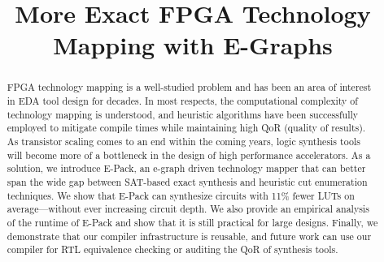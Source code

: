 \documentclass[sigplan,nonacm]{acmart}
\newcommand{\fullname}{More Exact FPGA Technology Mapping with E-Graphs}
\newcommand{\metric}{11\% fewer LUTs}
\begin{document}
\title{\fullname}

\begin{abstract}
    FPGA technology mapping is a well-studied problem and has been an area of
    interest in EDA tool design for decades. In most respects, the computational
    complexity of technology mapping is understood, and heuristic algorithms have
    been successfully employed to mitigate compile times while maintaining high QoR
    (quality of results). As transistor scaling comes to an end within the coming
    years, logic synthesis tools will become more of a bottleneck in the design of
    high performance accelerators. As a solution, we introduce E-Pack, an e-graph
    driven technology mapper that can better span the wide gap between SAT-based
    exact synthesis and heuristic cut enumeration techniques. We show that E-Pack
    can synthesize circuits with \metric{} on average---without ever
    increasing circuit depth. We also provide an empirical analysis of the runtime
    of E-Pack and show that it is still practical for large designs. Finally, we
    demonstrate that our compiler infrastructure is reusable, and future work can
    use our compiler for RTL equivalence checking or auditing the QoR of synthesis
    tools.
\end{abstract}
\maketitle %













\end{document}
